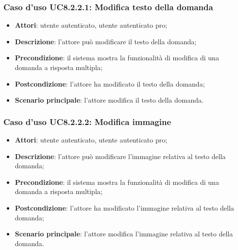 \subsubsection{Caso d'uso UC8.2.2.1: Modifica testo della domanda}
	\begin{itemize}
		\item
			\textbf{Attori}: utente autenticato, utente autenticato pro;
		\item		
			\textbf{Descrizione}: l'attore può modificare il testo della domanda;
		\item
			\textbf{Precondizione}: il sistema mostra la funzionalità di modifica di una domanda a risposta multipla;
		\item
			\textbf{Postcondizione}: l'attore ha modificato il testo della domanda;
		\item
			\textbf{Scenario principale}: l'attore modifica il testo della domanda. 
	 			
	\end{itemize}
	
\subsubsection{Caso d'uso UC8.2.2.2: Modifica immagine}
	\begin{itemize}
		\item
			\textbf{Attori}: utente autenticato, utente autenticato pro;
		\item		
			\textbf{Descrizione}: l'attore può modificare l'immagine relativa al testo della domanda;
		\item
			\textbf{Precondizione}: il sistema mostra la funzionalità di modifica di una domanda a risposta multipla;
		\item
			\textbf{Postcondizione}: l'attore ha modificato l'immagine relativa al testo della domanda;
		\item
			\textbf{Scenario principale}: l'attore modifica l'immagine relativa al testo della domanda. 	
	\end{itemize}
	
	
